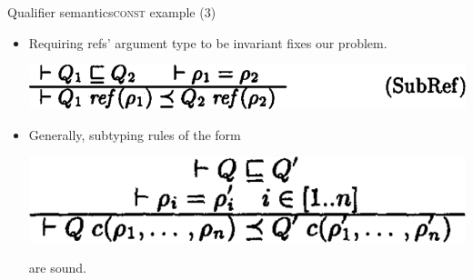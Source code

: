 \documentclass{beamer}
\begin{document}
\begin{frame}{Qualifier semantics}{\textsc{const} example (3)}
  \begin{itemize}
  \item Requiring refs' argument type to be invariant fixes our problem.
    \begin{center}
    \includegraphics[scale=0.29]{paper_ref_sound.png}
    \end{center}
  \item<2-> Generally, subtyping rules of the form
    \begin{center}
    \includegraphics[scale=0.3]{paper_subtypingrule_general.png}
    \end{center}
    are sound.
  \end{itemize}
\end{frame}
\end{document}
